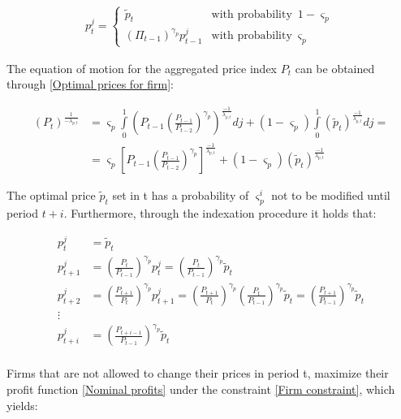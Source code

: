 \documentclass{pracamgr}
\numberwithin{equation}{section}
\begin{document}
\begin{align}
p_{t}^{j}  = \begin{cases}
\widetilde{p}_{t} & \text{with probability} \enspace 1-\varsigma_{p} \\
\left( \Pi_{t-1} \right)^{\gamma_{p}}p_{t-1}^{j} & \text{with probability} \enspace \varsigma_{p} 
\end{cases}
\end{align}

The equation of motion for the aggregated price index $P_{t}$ can be obtained through \ref{Optimal prices for firm}:

\begin{align}
\left( P_{t} \right)^{\frac{1}{-\lambda_{p,t}}} &= \varsigma_{p} \int\limits_{0}^{1} \left( P_{t-1}\left(\frac{P_{t-1}}{P_{t-2}}\right)^{\gamma_{p}} \right)^{\frac{-1}{\lambda_{p,t}}} dj + (1-\varsigma_{p}) \int\limits_{0}^{1} \left(\widetilde{p}_{t} \right)^{\frac{-1}{\lambda_{p,t}}} dj = \nonumber \\
& =  \varsigma_{p} \left[ P_{t-1}\left(\frac{P_{t-1}}{P_{t-2}}\right)^{\gamma_{p}} \right]^{\frac{-1}{\lambda_{p,t}}} + (1-\varsigma_{p}) \left(\widetilde{p}_{t} \right)^{\frac{-1}{\lambda_{p,t}}}
\end{align}

The optimal price $\widetilde{p}_{t}$ set in t has a probability of $\varsigma_{p}^{i}$ not to be modified until period $t+i$. Furthermore, through the indexation procedure it holds that:

\begin{align} \label{Firm constraint}
p_{t}^{j} &= \widetilde{p}_{t} \nonumber \\
p_{t+1}^{j} &= \left( \frac{P_{t}}{P_{t-1}} \right)^{\gamma_{p}} p_{t}^{j} = \left( \frac{P_{t}}{P_{t-1}} \right)^{\gamma_{p}} \widetilde{p}_{t}  \nonumber \\
p_{t+2}^{j} &= \left( \frac{P_{t+1}}{P_{t}} \right)^{\gamma_{p}}  p_{t+1}^{j} = \left( \frac{P_{t+1}}{P_{t}} \right)^{\gamma_{p}} \left( \frac{P_{t}}{P_{t-1}} \right)^{\gamma_{p}}  \widetilde{p}_{t} = \left( \frac{P_{t+1}}{P_{t-1}} \right)^{\gamma_{p}} \widetilde{p}_{t} \nonumber \\ \vdots \nonumber \\
p_{t+i}^{j} &= \left( \frac{P_{t+i-1}}{P_{t-1}} \right)^{\gamma_{p}} \widetilde{p}_{t} \nonumber \\
\end{align}

Firms that are not allowed to change their prices in period t, maximize their profit function \ref{Nominal profits} under the constraint \ref{Firm constraint}, which yields:
\end{document}
